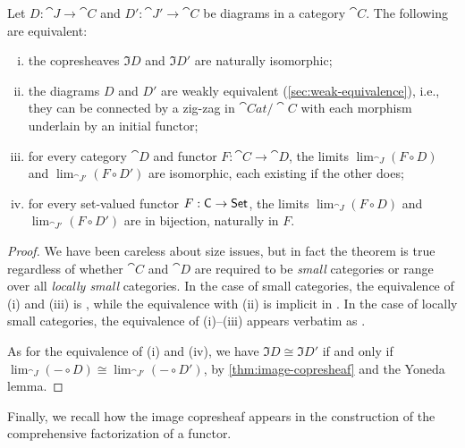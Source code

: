 \documentclass[11pt]{article}
\numberwithin{equation}{section}
\begin{document}
\begin{theorem}
  \label{thm:image-copresheaf-isomorphism}
  Let $D: \cat{J} \to \cat{C}$ and $D': \cat{J}' \to \cat{C}$ be diagrams in a
  category $\cat{C}$. The following are equivalent:
  \begin{enumerate}[(i)]
    \item the copresheaves $\Im D$ and $\Im D'$ are naturally isomorphic;
    \item the diagrams $D$ and $D'$ are weakly equivalent
      (\cref{sec:weak-equivalence}), i.e., they can be connected by a zig-zag in
      $\cat{Cat}/\cat{C}$ with each morphism underlain by an initial functor;
    \item for every category $\cat{D}$ and functor $F: \cat{C} \to \cat{D}$, the
      limits $\lim_{\cat{J}} (F \circ D)$ and $\lim_{\cat{J}'} (F \circ D')$ are
      isomorphic, each existing if the other does;
    \item for every set-valued functor $F: \mathsf{C} \to \mathsf{Set}$, the limits
      $\lim_{\cat{J}} (F \circ D)$ and $\lim_{\cat{J}'} (F \circ D')$ are in
      bijection, naturally in $F$.
  \end{enumerate}
\end{theorem}
\begin{proof}
  We have been careless about size issues, but in fact the theorem is true
  regardless of whether $\cat{C}$ and $\cat{D}$ are required to be \emph{small}
  categories or range over all \emph{locally small} categories. In the case of
  small categories, the equivalence of (i) and (iii) is \cite[\mbox{Theorem
    3.2}]{pare1973}, while the equivalence with (ii) is implicit in \cite[end of
  \S{3}]{pare1973}. In the case of locally small categories, the equivalence of
  (i)--(iii) appears verbatim as \cite[\mbox{Proposition 3.9}]{perrone2022}.

  As for the equivalence of (i) and (iv), we have $\Im D \cong \Im D'$ if and
  only if $\lim_{\cat{J}} (- \circ D) \cong \lim_{\cat{J}'} (- \circ D')$, by
  \cref{thm:image-copresheaf} and the Yoneda lemma.
\end{proof}

Finally, we recall how the image copresheaf appears in the construction of the
comprehensive factorization of a functor.
\end{document}
